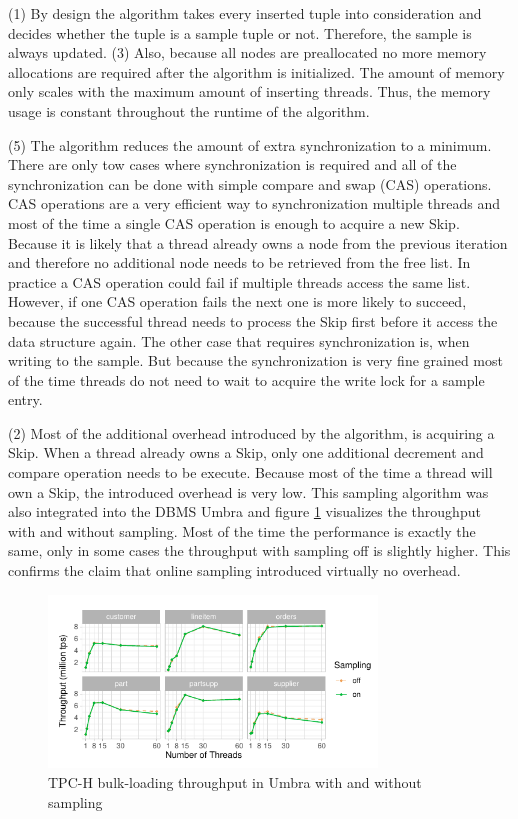 \documentclass[sigconf,nonacm]{acmart}
\begin{document}
        (1) By design the algorithm takes every inserted tuple into consideration and decides whether the tuple is a sample tuple or not. Therefore, the sample is always updated. (3) Also, because all nodes are preallocated no more memory allocations are required after the algorithm is initialized. The amount of memory only scales with the maximum amount of inserting threads. Thus, the memory usage is constant throughout the runtime of the algorithm. 

        (5) The algorithm reduces the amount of extra synchronization to a minimum. There are only tow cases where synchronization is required and all of the synchronization can be done with simple compare and swap (CAS) operations. CAS operations are a very efficient way to  synchronization multiple threads and most of the time a single CAS operation is enough to acquire a new Skip. Because it is likely that a thread already owns a node from the previous iteration and therefore no additional node needs to be retrieved from the free list. In practice a CAS operation could fail if multiple threads access the same list. However, if one CAS operation fails the next one is more likely to succeed, because the successful thread needs to process the Skip first before it access the data structure again. The other case that requires synchronization is, when writing to the sample. But because the synchronization is very fine grained most of the time threads do not need to wait to acquire the write lock for a sample entry.

        (2) Most of the additional overhead introduced by the algorithm, is acquiring a Skip. When a thread already owns a Skip, only one additional decrement and compare operation needs to be execute. Because most of the time a thread will own a Skip, the introduced overhead is very low. This sampling algorithm was also integrated into the DBMS Umbra\cite{Umbra} and figure \ref{fig:performance} visualizes the throughput with and without sampling. Most of the time the performance is exactly the same, only in some cases the throughput with sampling off is slightly higher. This confirms the claim that online sampling introduced virtually no overhead.
        \begin{figure}[h]
            \includegraphics[height=4.6cm]{figure7.pdf}
            \caption{TPC-H bulk-loading throughput in Umbra\cite{Umbra} with
            and without sampling \cite[figure 6]{OG}}
            \label{fig:performance}
        \end{figure}
\end{document}
